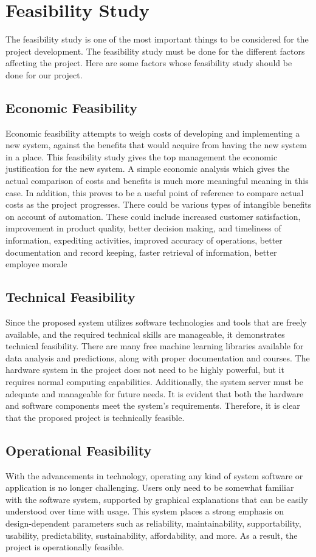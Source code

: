 \section{Feasibility Study}
The feasibility study is one of the most important things to be considered for the project 
development. The feasibility study must be done for the different factors affecting the 
project. Here are some factors whose feasibility study should be done for our project.
\subsection{Economic Feasibility}
Economic feasibility attempts to weigh costs of developing and implementing a new 
system, against the benefits that would acquire from having the new system in a place. 
This feasibility study gives the top management the economic justification for the new 
system. A simple economic analysis which gives the actual comparison of costs and 
benefits is much more meaningful meaning in this case. In addition, this proves to be a 
useful point of reference to compare actual costs as the project progresses. There could 
be various types of intangible benefits on account of automation. These could include 
increased customer satisfaction, improvement in product quality, better decision 
making, and timeliness of information, expediting activities, improved accuracy of 
operations, better documentation and record keeping, faster retrieval of information, 
better employee morale
\subsection{Technical Feasibility}
Since the proposed system utilizes software technologies and tools that are freely available, and the required technical skills are manageable, it demonstrates technical feasibility. There are many free machine learning libraries available for data analysis and predictions, along with proper documentation and courses. The hardware system in the project does not need to be highly powerful, but it requires normal computing capabilities. Additionally, the system server must be adequate and manageable for future needs. It is evident that both the hardware and software components meet the system's requirements. Therefore, it is clear that the proposed project is technically feasible.
\subsection{Operational Feasibility}
With the advancements in technology, operating any kind of system software or application is no longer challenging. Users only need to be somewhat familiar with the software system, supported by graphical explanations that can be easily understood over time with usage. This system places a strong emphasis on design-dependent parameters such as reliability, maintainability, supportability, usability, predictability, sustainability, affordability, and more. As a result, the project is operationally feasible.
